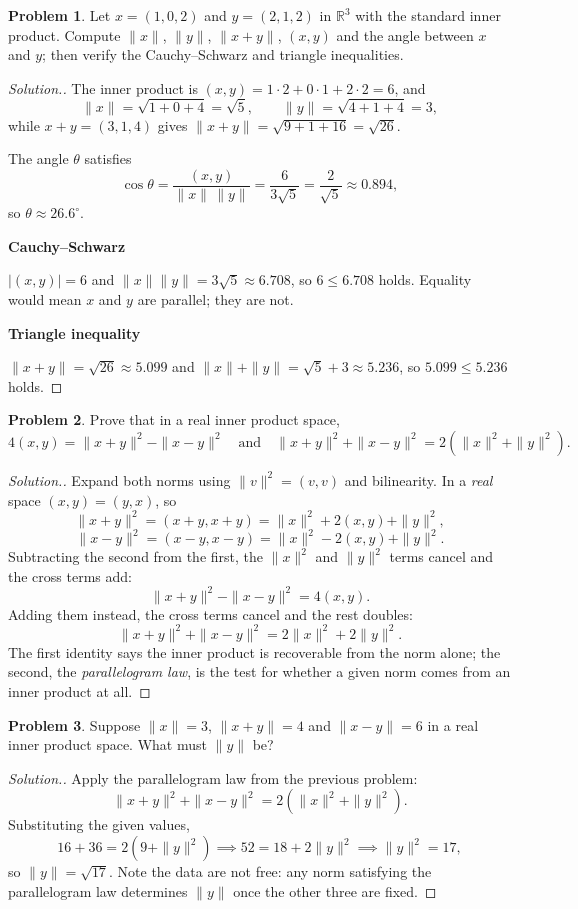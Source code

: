 \documentclass[11pt,a4paper]{article}
\theoremstyle{definition}
\newtheorem{problemx}{Problem}[section]
\newenvironment{problem}{\begin{problemx}}{\end{problemx}}
\newenvironment{solution}
  {\renewcommand{\qedsymbol}{}\begin{proof}[\textit{Solution}.]}
  {\end{proof}}
\newcommand{\subhead}[1]{%
  \par\medskip\noindent\textbf{#1}\par\nobreak\smallskip}
\begin{document}
\begin{problem}
Let $x=(1,0,2)$ and $y=(2,1,2)$ in $\mathbb{R}^3$ with the standard inner
product. Compute $\|x\|$, $\|y\|$, $\|x+y\|$, $(x,y)$ and the angle between
$x$ and $y$; then verify the Cauchy--Schwarz and triangle inequalities.
\end{problem}
\begin{solution}
The inner product is $(x,y)=1\cdot 2+0\cdot 1+2\cdot 2=6$, and
$$\|x\|=\sqrt{1+0+4}=\sqrt5,\qquad \|y\|=\sqrt{4+1+4}=3,$$
while $x+y=(3,1,4)$ gives $\|x+y\|=\sqrt{9+1+16}=\sqrt{26}$.

The angle $\theta$ satisfies
$$\cos\theta=\frac{(x,y)}{\|x\|\,\|y\|}=\frac{6}{3\sqrt5}=\frac{2}{\sqrt5}
\approx 0.894,$$
so $\theta\approx 26.6^{\circ}$.

\subhead{Cauchy--Schwarz}
$|(x,y)|=6$ and $\|x\|\|y\|=3\sqrt5\approx 6.708$, so $6\leq 6.708$ holds.
Equality would mean $x$ and $y$ are parallel; they are not.

\subhead{Triangle inequality}
$\|x+y\|=\sqrt{26}\approx 5.099$ and $\|x\|+\|y\|=\sqrt5+3\approx 5.236$, so
$5.099\leq 5.236$ holds.
\end{solution}

\begin{problem}
Prove that in a real inner product space,
$$4(x,y)=\|x+y\|^2-\|x-y\|^2 \quad\text{and}\quad
\|x+y\|^2+\|x-y\|^2=2\left(\|x\|^2+\|y\|^2\right).$$
\end{problem}
\begin{solution}
Expand both norms using $\|v\|^2=(v,v)$ and bilinearity. In a \emph{real} space
$(x,y)=(y,x)$, so
$$\|x+y\|^2=(x+y,x+y)=\|x\|^2+2(x,y)+\|y\|^2,$$
$$\|x-y\|^2=(x-y,x-y)=\|x\|^2-2(x,y)+\|y\|^2.$$
Subtracting the second from the first, the $\|x\|^2$ and $\|y\|^2$ terms cancel
and the cross terms add:
$$\|x+y\|^2-\|x-y\|^2=4(x,y).$$
Adding them instead, the cross terms cancel and the rest doubles:
$$\|x+y\|^2+\|x-y\|^2=2\|x\|^2+2\|y\|^2.$$
The first identity says the inner product is recoverable from the norm alone;
the second, the \emph{parallelogram law}, is the test for whether a given norm
comes from an inner product at all.
\end{solution}

\begin{problem}
Suppose $\|x\|=3$, $\|x+y\|=4$ and $\|x-y\|=6$ in a real inner product space.
What must $\|y\|$ be?
\end{problem}
\begin{solution}
Apply the parallelogram law from the previous problem:
$$\|x+y\|^2+\|x-y\|^2=2\left(\|x\|^2+\|y\|^2\right).$$
Substituting the given values,
$$16+36=2(9+\|y\|^2)\implies 52=18+2\|y\|^2\implies \|y\|^2=17,$$
so $\|y\|=\sqrt{17}$. Note the data are not free: any norm satisfying the
parallelogram law determines $\|y\|$ once the other three are fixed.
\end{solution}
\end{document}
